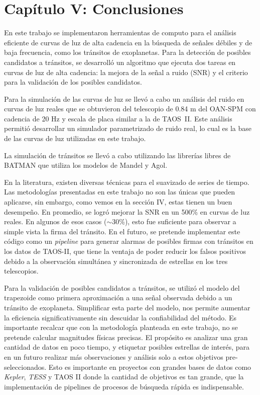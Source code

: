 \chapter*{\textbf{Capítulo V: Conclusiones}}
\label{ch:Conclusiones}
\setcounter{chapter}{5}
\setcounter{equation}{0}
\setcounter{figure}{0}
\setcounter{table}{0}

En este trabajo se implementaron herramientas de computo para el análisis eficiente de curvas de luz de alta cadencia en la búsqueda de señales débiles y de baja frecuencia, como los tránsitos de exoplanetas. Para la detección de posibles candidatos a tránsitos, se desarrolló un algoritmo que ejecuta dos tareas en curvas de luz de alta cadencia: la mejora de la señal a ruido (SNR) y el criterio para la validación de los posibles candidatos.

Para la simulación de las curvas de luz se llevó a cabo un análisis del ruido en curvas de luz reales que se obtuvieron del telescopio de 0.84 m del OAN-SPM con cadencia de 20 Hz y escala de placa similar a la de TAOS~II. Este análisis permitió desarrollar un simulador parametrizado de ruido real, lo cual es la base de las curvas de luz utilizadas en este trabajo.

La simulación de tránsitos se llevó a cabo utilizando las librerías libres de BATMAN que utiliza los modelos de Mandel y Agol.

En la literatura, existen diversas técnicas para el suavizado de series de tiempo. Las metodologías presentadas en este trabajo no son las únicas que pueden aplicarse, sin embargo, como vemos en la sección IV, estas tienen un buen desempeño. En promedio, se logró mejorar la SNR en un 500\% en curvas de luz reales. En algunos de esos casos ($\sim 30$\%), esto fue suficiente para observar a simple vista la firma del tránsito. En el futuro, se pretende implementar este código como un \textit{pipeline} para generar alarmas de posibles firmas con tránsitos en los datos de TAOS-II, que tiene la ventaja de poder reducir los falsos positivos debido a la observación simultánea y sincronizada de estrellas en los tres telescopios.

Para la validación de posibles candidatos a tránsitos, se utilizó el modelo del trapezoide como primera aproximación a una señal observada debido a un tránsito de exoplaneta. Simplificar esta parte del modelo, nos permite aumentar la eficiencia significativamente sin descuidar la confiabilidad del método. Es importante recalcar que con la metodología planteada en este trabajo, no se pretende calcular magnitudes físicas precisas. El propósito es analizar una gran cantidad de datos en poco tiempo, y etiquetar posibles estrellas de interés, para en un futuro realizar más observaciones y análisis solo a estos objetivos pre-seleccionados. Esto es importante en proyectos con grandes bases de datos como \textit{Kepler}, \textit{TESS} y TAOS II donde la cantidad de objetivos es tan grande, que la implementación de pipelines de procesos de búsqueda rápida es indispensable.


